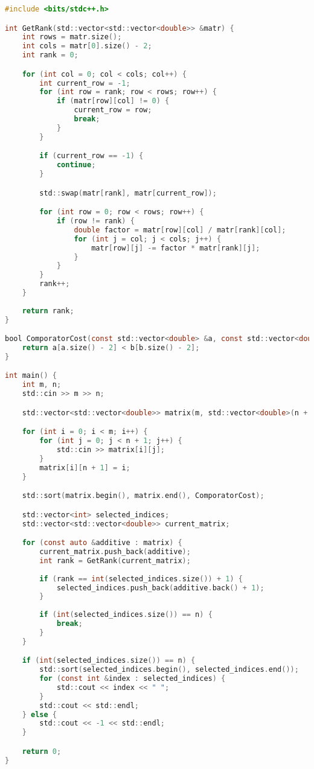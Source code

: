 \begin{lstlisting}[language=C]
#include <bits/stdc++.h>

int GetRank(std::vector<std::vector<double>> &matr) {
    int rows = matr.size();
    int cols = matr[0].size() - 2;
    int rank = 0;

    for (int col = 0; col < cols; col++) {
        int current_row = -1;
        for (int row = rank; row < rows; row++) {
            if (matr[row][col] != 0) {
                current_row = row;
                break;
            }
        }

        if (current_row == -1) {
            continue;
        }

        std::swap(matr[rank], matr[current_row]);

        for (int row = 0; row < rows; row++) {
            if (row != rank) {
                double factor = matr[row][col] / matr[rank][col];
                for (int j = col; j < cols; j++) {
                    matr[row][j] -= factor * matr[rank][j];
                }
            }
        }
        rank++;
    }
    
    return rank;
}

bool ComporatorCost(const std::vector<double> &a, const std::vector<double> &b) {
    return a[a.size() - 2] < b[b.size() - 2];
}

int main() {
    int m, n;
    std::cin >> m >> n;

    std::vector<std::vector<double>> matrix(m, std::vector<double>(n + 2));

    for (int i = 0; i < m; i++) {
        for (int j = 0; j < n + 1; j++) {
            std::cin >> matrix[i][j];
        }
        matrix[i][n + 1] = i;
    }

    std::sort(matrix.begin(), matrix.end(), ComporatorCost);

    std::vector<int> selected_indices;
    std::vector<std::vector<double>> current_matrix;

    for (const auto &additive : matrix) {
        current_matrix.push_back(additive);
        int rank = GetRank(current_matrix);
        
        if (rank == int(selected_indices.size()) + 1) {
            selected_indices.push_back(additive.back() + 1);
        }
        
        if (int(selected_indices.size()) == n) {
            break;
        }
    }

    if (int(selected_indices.size()) == n) {
        std::sort(selected_indices.begin(), selected_indices.end());
        for (const int &index : selected_indices) {
            std::cout << index << " ";
        }
        std::cout << std::endl;
    } else {
        std::cout << -1 << std::endl;
    }

    return 0;
}
\end{lstlisting}


